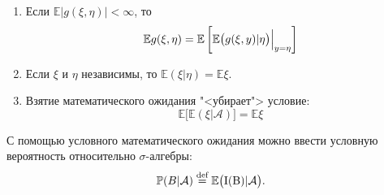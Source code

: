 \begin{namedthm}
\begin{enumerate}
\begin{proof}
                    Обозначим $h(\eta)=f(\eta) g(\eta) \in L$. 
                    Эта функция ограничена, поэтому
                    \begin{equation*}
                        \mathbb{E}(\xi f(\eta) \cdot g(\eta))=\mathbb{E}(\xi h(\eta))=\mathbb{E}(\widehat{\xi} h(\eta))=\mathbb{E}(\zeta \cdot g(\eta))
                    \end{equation*}
                \end{proof}
        \fi
            \item 
                Если $\mathbb{E}\bigl| g(\xi, \eta) \bigr| <\infty$, то
                \begin{equation*}
                    \mathbb{E} g(\xi, \eta)=\mathbb{E}\left[\Bigl.\mathbb{E}\bigl(g(\xi, y) | \eta\bigr)\Bigr|_{y=\eta}\right]
                \end{equation*}
            \item 
                Если $\xi$ и $\eta$ независимы, то $\mathbb{E}(\xi | \eta)=\mathbb{E} \xi$.
            \item
                Взятие математического ожидания "<убирает"> условие:
                \begin{equation*}
                    \mathbb{E}\bigl[ \mathbb{E} \left(\xi | \mathcal{A} \right)\bigr] = \mathbb{E} \xi
                \end{equation*}                
        \end{enumerate}
    \end{namedthm}
    С помощью условного математического ожидания можно ввести условную вероятность относительно $\sigma$-алгебры:
    \begin{equation*}
        \mathbb{P}(B | \mathcal{A}) \overset{\text{def}}{=} \mathbb{E}\bigl(\rm{I}(B) | \mathcal{A} \bigr).
    \end{equation*}

\iffalse
